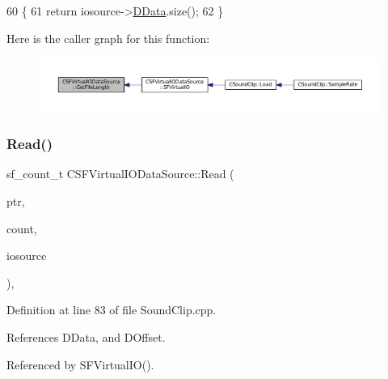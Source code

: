 \begin{DoxyCode}
60                                                                                 \{
61     \textcolor{keywordflow}{return} iosource->\hyperlink{classCSFVirtualIODataSource_ac03be5c46b6647150e12edc04fa52ede}{DData}.size();
62 \}
\end{DoxyCode}
Here is the caller graph for this function\+:\nopagebreak
\begin{figure}[H]
\begin{center}
\leavevmode
\includegraphics[width=350pt]{classCSFVirtualIODataSource_a94ee0d9f4703661ca7f2cad8cf294690_icgraph}
\end{center}
\end{figure}
\hypertarget{classCSFVirtualIODataSource_a40021962590f0911d8af1020397fbba1}{}\label{classCSFVirtualIODataSource_a40021962590f0911d8af1020397fbba1} 
\subsubsection{\texorpdfstring{Read()}{Read()}}
{\footnotesize\ttfamily sf\+\_\+count\+\_\+t C\+S\+F\+Virtual\+I\+O\+Data\+Source\+::\+Read (\begin{DoxyParamCaption}\item[{void $\ast$}]{ptr,  }\item[{sf\+\_\+count\+\_\+t}]{count,  }\item[{\hyperlink{classCSFVirtualIODataSource}{C\+S\+F\+Virtual\+I\+O\+Data\+Source} $\ast$}]{iosource }\end{DoxyParamCaption})\hspace{0.3cm}{\ttfamily [static]}, {\ttfamily [protected]}}



Definition at line 83 of file Sound\+Clip.\+cpp.



References D\+Data, and D\+Offset.



Referenced by S\+F\+Virtual\+I\+O().


